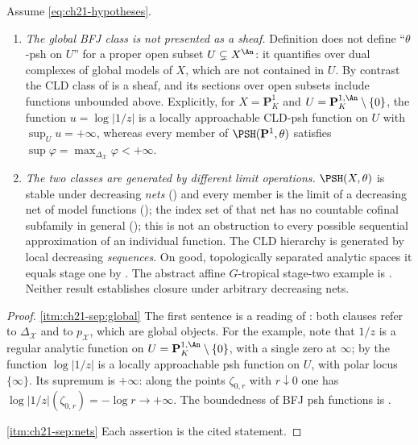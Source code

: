 \begin{proposition}
\label{prop:ch21-bfj-vs-cld}
Assume \eqref{eq:ch21-hypotheses}.
\begin{enumerate}
\item\label{itm:ch21-sep:global}
\emph{The global BFJ class is not presented as a sheaf.}  Definition
 does not define ``$\theta$-psh on $U$'' for a
proper open subset $U\subsetneq X^{\An}$: it quantifies over dual
complexes of global models of $X$, which are not contained in $U$.  By
contrast the CLD class of  is a sheaf, and its
sections over open subsets include functions unbounded above.  Explicitly,
for $X=\mathbf P^1_K$ and $U=\mathbf P^{1,\An}_K\setminus\{0\}$, the
function $u=\log|1/z|$ is a locally approachable CLD-psh function on
$U$ with $\sup_Uu=+\infty$, whereas every member of
$\PSH(\mathbf P^1,\theta)$ satisfies
$\sup\varphi=\max_{\Delta_{\mathcal X}}\varphi<+\infty$.
\item\label{itm:ch21-sep:nets}
\emph{The two classes are generated by different limit operations.}
$\PSH(X,\theta)$ is stable under decreasing \emph{nets}
() and every member is the limit of a
decreasing net of model functions
(); the index set of that net has no
countable cofinal subfamily in general
(); this is not an obstruction to
every possible sequential approximation of an individual function.
The CLD hierarchy is generated by local decreasing \emph{sequences}.
On good, topologically separated analytic spaces it equals stage one by
.  The abstract affine
$G$-tropical stage-two example is
.  Neither result establishes
closure under arbitrary decreasing nets.
\end{enumerate}
\end{proposition}

\begin{proof}
\cref{itm:ch21-sep:global}  The first sentence is a reading of
: both clauses refer to $\Delta_{\mathcal X}$ and
to $p_{\mathcal X}$, which are global objects.  For the example, note that
$1/z$ is a regular analytic function on
$U=\mathbf P^{1,\An}_K\setminus\{0\}$, with a single zero at $\infty$;
by  the function $\log|1/z|$ is a
locally approachable psh function on $U$, with polar locus
$\{\infty\}$.  Its supremum is $+\infty$: along the points
$\zeta_{0,r}$ with $r\downarrow0$ one has
$\log|1/z|(\zeta_{0,r})=-\log r\to+\infty$.  The boundedness of BFJ psh
functions is .

\cref{itm:ch21-sep:nets}  Each assertion is the cited statement.
\end{proof}

